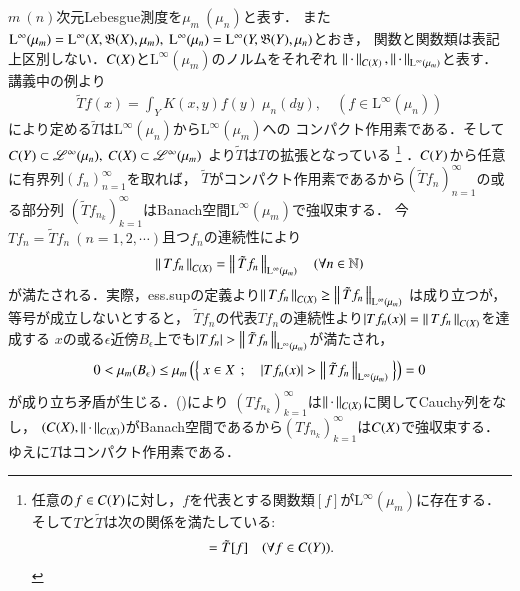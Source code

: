 	\begin{prf}
		$m\ (n)$次元Lebesgue測度を$\mu_m\ (\mu_n)$と表す．
		また$\mathrm{L}^\infty(\mu_m) = \mathrm{L}^\infty(X,\borel{X},\mu_m),\ 
		\mathrm{L}^\infty(\mu_n) = \mathrm{L}^\infty(Y,\borel{Y},\mu_n)$とおき，
		関数と関数類は表記上区別しない．$C(X)$と$\mathrm{L}^\infty(\mu_m)$のノルムをそれぞれ
		$\left\|\, \cdot\, \right\|_{C(X)},\left\|\, \cdot\, \right\|_{\mathrm{L}^\infty(\mu_m)}$と表す．
		講義中の例より
		\begin{align}
			\tilde{T}f (x) = \int_Y K(x,y) f(y)\ \mu_n(dy),
			\quad \left( f \in \mathrm{L}^\infty(\mu_n) \right)
		\end{align}
		により定める$\tilde{T}$は$\mathrm{L}^\infty(\mu_n)$から$\mathrm{L}^\infty(\mu_m)$への
		コンパクト作用素である．そして$C(Y) \subset \mathscr{L}^\infty(\mu_n),\ C(X) \subset \mathscr{L}^\infty(\mu_m)$
		より$\tilde{T}$は$T$の拡張となっている
		\footnote{
			任意の$f \in C(Y)$に対し，$f$を代表とする関数類$[f]$が$\mathrm{L}^\infty(\mu_m)$に存在する．
			そして$T$と$\tilde{T}$は次の関係を満たしている:
			\begin{align}
				[Tf] = \tilde{T}[f]
				\quad (\forall f \in \c{Y}).
			\end{align}
		}
		．$C(Y)$から任意に有界列$(f_n)_{n=1}^{\infty}$を取れば，
		$\tilde{T}$がコンパクト作用素であるから$\left( \tilde{T} f_n \right)_{n=1}^{\infty}$の或る部分列
		$\left( \tilde{T} f_{n_k} \right)_{k=1}^{\infty}$はBanach空間$\mathrm{L}^\infty(\mu_m)$で強収束する．
		今$T f_n = \tilde{T} f_n\ (n=1,2,\cdots)$且つ$f_n$の連続性により
		\begin{align}
			\left\|\, T f_n\, \right\|_{C(X)} = \left\|\, \tilde{T}f_n\, \right\|_{\mathrm{L}^\infty(\mu_m)} 
			\quad (\forall n \in \mathbb{N})
			\label{eq:report_5}
		\end{align}
		が満たされる．実際，ess.supの定義より$\left\|\, T f_n\, \right\|_{C(X)} \geq \left\|\, \tilde{T}f_n\, \right\|_{\mathrm{L}^\infty(\mu_m)}$
		は成り立つが，等号が成立しないとすると，
		$\tilde{T}f_n$の代表$T f_n$の連続性より$|T f_n(x)| = \left\|\, T f_n\, \right\|_{C(X)}$を達成する
		$x$の或る$\epsilon$近傍$B_\epsilon$上でも$|Tf_n| > \left\|\, \tilde{T}f_n\, \right\|_{\mathrm{L}^\infty(\mu_m)}$が満たされ，
		\begin{align}
			0 < \mu_m(B_\epsilon) \leq \mu_m \left( \left\{\ x \in X\ \, ; \quad \left| Tf_n(x) \right| > \left\|\, \tilde{T}f_n\, \right\|_{\mathrm{L}^\infty(\mu_m)}\ \right\} \right) = 0
		\end{align}
		が成り立ち矛盾が生じる．()により
		$\left( T f_{n_k} \right)_{k=1}^{\infty}$は$\left\|\, \cdot\, \right\|_{C(X)}$に関してCauchy列をなし，
		$(C(X),\left\|\, \cdot\, \right\|_{C(X)})$がBanach空間であるから$\left( T f_{n_k} \right)_{k=1}^{\infty}$は$C(X)$で強収束する．
		ゆえに$T$はコンパクト作用素である．
		\QED
	\end{prf}
	
